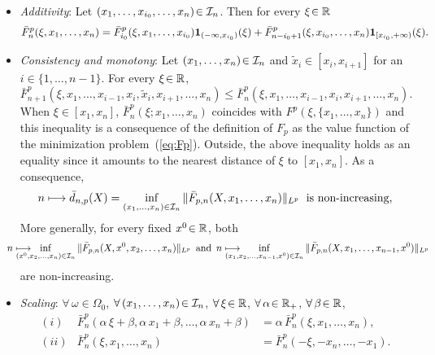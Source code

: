 \begin{itemize}
\item {\em Additivity}: Let $(x_1, \ldots,x_{i_0},\ldots,x_n)\!\in {\cal I}_n$. Then for every $\xi\!\in \mathbb{R}$
\[
\bar F^p_n (\xi, x_1,\ldots,x_n)= \bar F^p_{i_0} (\xi,
x_1,\ldots,x_{i_0})\mbox{\bf 1}_{(-\infty,x_{i_0})}(\xi)+ \bar F^p_{n- i_0+1}
(\xi, x_{i_0},\ldots,x_{n})\mbox{\bf 1}_{ [x_{i_0}, +\infty)}(\xi).
\]
\item
 {\em  Consistency and monotony}:
 Let $(x_1,\ldots,x_{n})\!\in {\cal I}_{n}$ and $\widetilde x_i\!\in [x_i,x_{i+1}]$ for an $i\!\in \{1,\ldots,n-1\}$. For every  $\xi \!\in \mathbb{R}$, 
\[
\bar F^{p}_{n+1}(\xi, x_1,\ldots,x_{i-1},x_i,\widetilde x_i,x_{i+1},\ldots,x_n)\le \bar F^{p}_{n}(\xi, x_1,\ldots,x_{i-1},x_i,x_{i+1},\ldots,x_n).
\]
When $\xi\!\in [x_1,x_n]$, $\bar F_n^p(\xi;x_1,\dots,x_n)$ coincides with  $
F^p(\xi,\{x_1,\dots,x_n\})$ and this inequality is  a consequence of the
definition of $ F_p$ as the value function of the minimization
problem~(\ref{eq:Fp}). Outside, the above inequality holds as an equality since
it amounts to the nearest distance of $\xi$ to $[x_1,x_n]$. 
%
As a  consequence, 
\begin{equation}\label{monotonie1}
n\longmapsto \bar d_{n,p}(X)=  \inf_{(x_1,\ldots,x_n)\in {\cal I}_n}\|\bar F_{p,n}(X,
x_1,\ldots,x_n)\|_{L^p} \;\mbox{ is non-increasing,}
\end{equation}
More generally, for every fixed $x^0\!\in \mathbb{R}$, both
\begin{equation}\label{monotonie2}
\hskip -0.5cm  n\longmapsto\hskip -0.65cm   \inf_{(x^0,x_2,\ldots,x_n)\in {\cal I}_n}\|\bar F_{p,n}(X,x^0, x_2,\ldots,x_n)\|_{L^p} \,\mbox{ and }\,n\longmapsto \hskip -0.65cm  \inf_{(x_1,x_2,\ldots,x_{n-1},x^0)\in {\cal I}_n}\|\bar F_{p, n}(X, x_1,\ldots,x_{n-1},x^0)\|_{L^p} 
\end{equation}
are non-increasing.

\item {\em Scaling}: $\forall\,\omega\!\in \Omega_0$, $\forall\, (x_1,\ldots,x_n)\!\in {\cal I}_n$, $\forall\, \xi \!\in \mathbb{R}$, $\forall\, \alpha\!\in \mathbb{R}_+$,  $\forall\, \beta\!\in \mathbb{R}$,
\begin{eqnarray*}\label{eq:scaling}
(i)& \bar F^p_n(\alpha\, \xi+\beta, \alpha\, x_1 +\beta ,\ldots,\alpha\, x_n +\beta)&= \alpha \,\bar F_n^p(\xi,x_1,\ldots,x_n),\\
(ii) &\bar F^p_n(\xi, x_1   ,\ldots,x_n)&=\bar
F^p_n(-\xi,-x_n,\ldots,-x_1).
\end{eqnarray*}
\end{itemize}

